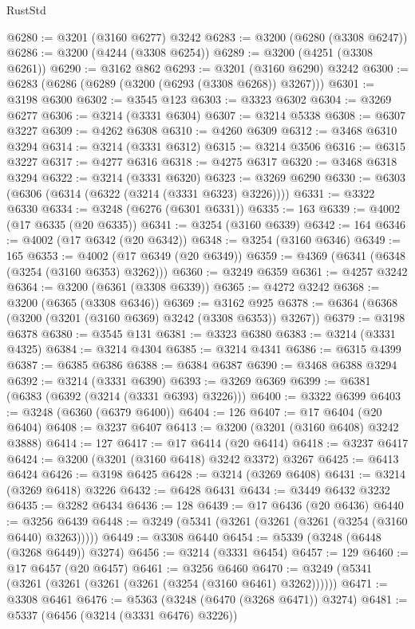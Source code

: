 \begin{lexlean}{RustStd}
\begin{coremodule}
{\begin{coremodule}
{{{{{{{{{{{{{{{{{{{{{{{{{@6280 := @3201 (@3160 @6277) @3242
@6283 := @3200 (@6280 (@3308 @6247))
@6286 := @3200 (@4244 (@3308 @6254))
@6289 := @3200 (@4251 (@3308 @6261))
@6290 := @3162 @862
@6293 := @3201 (@3160 @6290) @3242
@6300 := @6283 (@6286 (@6289 (@3200 (@6293 (@3308 @6268)) @3267)))
@6301 := @3198 @6300
@6302 := @3545 @123
@6303 := @3323 @6302
@6304 := @3269 @6277
@6306 := @3214 (@3331 @6304)
@6307 := @3214 @5338
@6308 := @6307 @3227
@6309 := @4262 @6308
@6310 := @4260 @6309
@6312 := @3468 @6310 @3294
@6314 := @3214 (@3331 @6312)
@6315 := @3214 @3506
@6316 := @6315 @3227
@6317 := @4277 @6316
@6318 := @4275 @6317
@6320 := @3468 @6318 @3294
@6322 := @3214 (@3331 @6320)
@6323 := @3269 @6290
@6330 := @6303 (@6306 (@6314 (@6322 (@3214 (@3331 @6323) @3226))))
@6331 := @3322 @6330
@6334 := @3248 (@6276 (@6301 @6331))
@6335 := 163
@6339 := @4002 (@17 @6335 (@20 @6335))
@6341 := @3254 (@3160 @6339)
@6342 := 164
@6346 := @4002 (@17 @6342 (@20 @6342))
@6348 := @3254 (@3160 @6346)
@6349 := 165
@6353 := @4002 (@17 @6349 (@20 @6349))
@6359 := @4369 (@6341 (@6348 (@3254 (@3160 @6353) @3262)))
@6360 := @3249 @6359
@6361 := @4257 @3242
@6364 := @3200 (@6361 (@3308 @6339))
@6365 := @4272 @3242
@6368 := @3200 (@6365 (@3308 @6346))
@6369 := @3162 @925
@6378 := @6364 (@6368 (@3200 (@3201 (@3160 @6369) @3242 (@3308 @6353)) @3267))
@6379 := @3198 @6378
@6380 := @3545 @131
@6381 := @3323 @6380
@6383 := @3214 (@3331 @4325)
@6384 := @3214 @4304
@6385 := @3214 @4341
@6386 := @6315 @4399
@6387 := @6385 @6386
@6388 := @6384 @6387
@6390 := @3468 @6388 @3294
@6392 := @3214 (@3331 @6390)
@6393 := @3269 @6369
@6399 := @6381 (@6383 (@6392 (@3214 (@3331 @6393) @3226)))
@6400 := @3322 @6399
@6403 := @3248 (@6360 (@6379 @6400))
@6404 := 126
@6407 := @17 @6404 (@20 @6404)
@6408 := @3237 @6407
@6413 := @3200 (@3201 (@3160 @6408) @3242 @3888)
@6414 := 127
@6417 := @17 @6414 (@20 @6414)
@6418 := @3237 @6417
@6424 := @3200 (@3201 (@3160 @6418) @3242 @3372) @3267
@6425 := @6413 @6424
@6426 := @3198 @6425
@6428 := @3214 (@3269 @6408)
@6431 := @3214 (@3269 @6418) @3226
@6432 := @6428 @6431
@6434 := @3449 @6432 @3232
@6435 := @3282 @6434
@6436 := 128
@6439 := @17 @6436 (@20 @6436)
@6440 := @3256 @6439
@6448 := @3249 (@5341 (@3261 (@3261 (@3261 (@3254 (@3160 @6440) @3263)))))
@6449 := @3308 @6440
@6454 := @5339 (@3248 (@6448 (@3268 @6449)) @3274)
@6456 := @3214 (@3331 @6454)
@6457 := 129
@6460 := @17 @6457 (@20 @6457)
@6461 := @3256 @6460
@6470 := @3249 (@5341 (@3261 (@3261 (@3261 (@3261 (@3254 (@3160 @6461) @3262))))))
@6471 := @3308 @6461
@6476 := @5363 (@3248 (@6470 (@3268 @6471)) @3274)
@6481 := @5337 (@6456 (@3214 (@3331 @6476) @3226))
}}}}}}}}}}}}}}}}}}}}}}}}}
\end{coremodule}}
\end{coremodule}
\end{lexlean}
